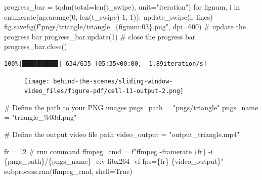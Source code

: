 \documentclass[
  letterpaper,
  DIV=11,
  numbers=noendperiod,
  oneside]{scrreprt}
\newenvironment{Shaded}{\begin{snugshade}}{\end{snugshade}}
\newcommand{\BuiltInTok}[1]{\textcolor[rgb]{0.00,0.23,0.31}{#1}}
\newcommand{\CommentTok}[1]{\textcolor[rgb]{0.37,0.37,0.37}{#1}}
\newcommand{\ControlFlowTok}[1]{\textcolor[rgb]{0.00,0.23,0.31}{#1}}
\newcommand{\DecValTok}[1]{\textcolor[rgb]{0.68,0.00,0.00}{#1}}
\newcommand{\KeywordTok}[1]{\textcolor[rgb]{0.00,0.23,0.31}{#1}}
\newcommand{\NormalTok}[1]{\textcolor[rgb]{0.00,0.23,0.31}{#1}}
\newcommand{\OperatorTok}[1]{\textcolor[rgb]{0.37,0.37,0.37}{#1}}
\newcommand{\SpecialCharTok}[1]{\textcolor[rgb]{0.37,0.37,0.37}{#1}}
\newcommand{\SpecialStringTok}[1]{\textcolor[rgb]{0.13,0.47,0.30}{#1}}
\newcommand{\StringTok}[1]{\textcolor[rgb]{0.13,0.47,0.30}{#1}}
\newcommand{\VariableTok}[1]{\textcolor[rgb]{0.07,0.07,0.07}{#1}}
\begin{document}
\begin{Shaded}
\begin{Highlighting}[]
\NormalTok{progress\_bar }\OperatorTok{=}\NormalTok{ tqdm(total}\OperatorTok{=}\BuiltInTok{len}\NormalTok{(t\_swipe), unit}\OperatorTok{=}\StringTok{"iteration"}\NormalTok{)}
\ControlFlowTok{for}\NormalTok{ fignum, i }\KeywordTok{in} \BuiltInTok{enumerate}\NormalTok{(np.arange(}\DecValTok{0}\NormalTok{, }\BuiltInTok{len}\NormalTok{(t\_swipe)}\OperatorTok{{-}}\DecValTok{1}\NormalTok{, }\DecValTok{1}\NormalTok{)):}
\NormalTok{    update\_swipe(i, lines)}
\NormalTok{    fig.savefig(}\SpecialStringTok{f"pngs/triangle/triangle\_}\SpecialCharTok{\{}\NormalTok{fignum}\SpecialCharTok{:03\}}\SpecialStringTok{.png"}\NormalTok{, dpi}\OperatorTok{=}\DecValTok{600}\NormalTok{)}
    \CommentTok{\# update the progress bar}
\NormalTok{    progress\_bar.update(}\DecValTok{1}\NormalTok{)}
\CommentTok{\# close the progress bar}
\NormalTok{progress\_bar.close()}
\end{Highlighting}
\end{Shaded}

\begin{verbatim}
100%|█████████▉| 634/635 [05:35<00:00,  1.89iteration/s]
\end{verbatim}

\begin{figure}[H]

{\centering \texttt{[image: behind-the-scenes/sliding-window-video\_files/figure-pdf/cell-11-output-2.png]}

}

\end{figure}

\begin{Shaded}
\begin{Highlighting}[]
\CommentTok{\# Define the path to your PNG images}
\NormalTok{pngs\_path }\OperatorTok{=} \StringTok{"pngs/triangle"}
\NormalTok{pngs\_name }\OperatorTok{=} \StringTok{"triangle\_}\SpecialCharTok{\%03d}\StringTok{.png"}

\CommentTok{\# Define the output video file path}
\NormalTok{video\_output }\OperatorTok{=} \StringTok{"output\_triangle.mp4"}

\NormalTok{fr }\OperatorTok{=} \DecValTok{12}
\CommentTok{\# run command}
\NormalTok{ffmpeg\_cmd }\OperatorTok{=} \SpecialStringTok{f"ffmpeg {-}framerate }\SpecialCharTok{\{}\NormalTok{fr}\SpecialCharTok{\}}\SpecialStringTok{ {-}i }\SpecialCharTok{\{}\NormalTok{pngs\_path}\SpecialCharTok{\}}\SpecialStringTok{/}\SpecialCharTok{\{}\NormalTok{pngs\_name}\SpecialCharTok{\}}\SpecialStringTok{ {-}c:v libx264 {-}vf fps=}\SpecialCharTok{\{}\NormalTok{fr}\SpecialCharTok{\}}\SpecialStringTok{ }\SpecialCharTok{\{}\NormalTok{video\_output}\SpecialCharTok{\}}\SpecialStringTok{"}
\NormalTok{subprocess.run(ffmpeg\_cmd, shell}\OperatorTok{=}\VariableTok{True}\NormalTok{)}
\end{Highlighting}
\end{Shaded}
\end{document}
